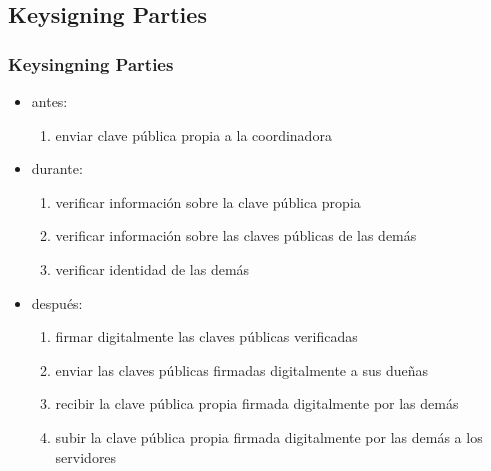 \documentclass{beamer}
\let\olditem\item
\renewcommand{\item}{%
\olditem\vspace{3pt}}
\begin{document}
\subsection{Keysigning Parties}
\begin{frame}
\frametitle{Keysingning Parties}
\begin{itemize}
    \item antes:
        \begin{enumerate}
            \item enviar clave pública propia a la coordinadora
        \end{enumerate}
    \item durante:
        \begin{enumerate}
            \item verificar información sobre la clave pública propia
            \item verificar información sobre las claves públicas de las demás
            \item verificar identidad de las demás
        \end{enumerate}
    \item después:
        \begin{enumerate}
            \item firmar digitalmente las claves públicas verificadas
            \item enviar las claves públicas firmadas digitalmente a sus dueñas
            \item recibir la clave pública propia firmada digitalmente por las demás
            \item subir la clave pública propia firmada digitalmente por las
                demás a los servidores
        \end{enumerate}
\end{itemize}
\end{frame}
\end{document}
